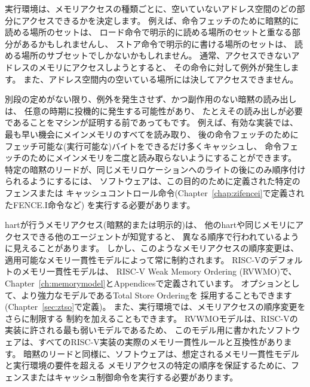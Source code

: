 実行環境は、メモリアクセスの種類ごとに、空いていないアドレス空間のどの部分にアクセスできるかを決定します。
例えば、命令フェッチのために暗黙的に読める場所のセットは、
ロード命令で明示的に読める場所のセットと重なる部分があるかもしれませんし、
ストア命令で明示的に書ける場所のセットは、
読める場所のサブセットでしかないかもしれません。
通常、アクセスできないアドレスのメモリにアクセスしようとすると、
その命令に対して例外が発生します。
また、アドレス空間内の空いている場所には決してアクセスできません。

別段の定めがない限り、例外を発生させず、かつ副作用のない暗黙の読み出しは、
任意の時期に投機的に発生する可能性があり、
たとえその読み出しが必要であることをマシンが証明する前であってもです。 例えば、有効な実装では、最も早い機会にメインメモリのすべてを読み取り、
後の命令フェッチのためにフェッチ可能な(実行可能な)バイトをできるだけ多くキャッシュし、
命令フェッチのためにメインメモリを二度と読み取らないようにすることができます。 特定の暗黙のリードが、同じメモリロケーションへのライトの後にのみ順序付けられるようにするには、
ソフトウェアは、この目的のために定義された特定のフェンスまたは
キャッシュコントロール命令(Chapter~\ref{chap:zifencei}で定義されたFENCE.I命令など)
を実行する必要があります。

hartが行うメモリアクセス(暗黙的または明示的)は、
他のhartや同じメモリにアクセスできる他のエージェントが知覚すると、
異なる順序で行われているように見えることがあります。
しかし、このようなメモリアクセスの順序変更は、適用可能なメモリ一貫性モデルによって常に制約されます。
RISC-Vのデフォルトのメモリ一貫性モデルは、
RISC-V Weak Memory Ordering (RVWMO)で、Chapter~\ref{ch:memorymodel}とAppendicesで定義されています。
オプションとして、より強力なモデルであるTotal Store Orderingを
採用することもできます(Chapter~\ref{sec:ztso}で定義)。 
また、実行環境では、メモリアクセスの順序変更をさらに制限する
制約を加えることもできます。
RVWMOモデルは、RISC-Vの実装に許される最も弱いモデルであるため、
このモデル用に書かれたソフトウェアは、すべてのRISC-V実装の実際のメモリ一貫性ルールと互換性があります。
暗黙のリードと同様に、ソフトウェアは、想定されるメモリ一貫性モデルと実行環境の要件を超える
メモリアクセスの特定の順序を保証するために、フェンスまたはキャッシュ制御命令を実行する必要があります。

